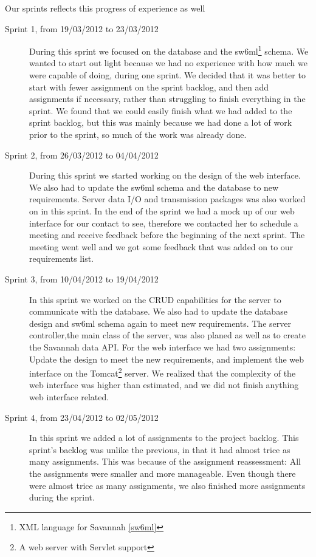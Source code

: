 Our sprints reflects this progress of experience as well

\begin{description}
\item [Sprint 1, from 19/03/2012 to 23/03/2012]
	During this sprint we focused on the database and the sw6ml\footnote{XML language for Savannah \autoref{sw6ml}} schema. We wanted to start out light because we had no experience with how much we were capable of doing, during one sprint. We decided that it was better to start with fewer assignment on the sprint backlog, and then add assignments if necessary, rather than struggling to finish everything in the sprint. We found that we could easily finish what we had added to the sprint backlog, but this was mainly because we had done a lot of work prior to the sprint, so much of the work was already done.
\item[Sprint 2, from 26/03/2012 to 04/04/2012]
	During this sprint we started working on the design of the web interface. We also had to update the sw6ml schema and the database to new requirements. Server data I/O and transmission packages was also worked on in this sprint. In the end of the sprint we had a mock up of our web interface for our contact to see, therefore we contacted her to schedule a meeting and receive feedback before the beginning of the next sprint. The meeting went well and we got some feedback that was added on to our requirements list. 
\item[Sprint 3, from 10/04/2012 to 19/04/2012]
	In this sprint we worked on the CRUD capabilities for the server to communicate with the database. We also had to update the database design and sw6ml schema again to meet new requirements. The server controller,the main class of the server, was also planed as well as to create the Savannah data API. For the web interface we had two assignments: Update the design to meet the new requirements, and implement the web interface on the Tomcat\footnote{A web server with Servlet support} server. We realized that the complexity of the web interface was higher than estimated, and we did not finish anything web interface related.
\item [Sprint 4, from 23/04/2012 to 02/05/2012]
	In this sprint we added a lot of assignments to the project backlog. This sprint's backlog was unlike the previous, in that it had almost trice as many assignments. This was because of the assignment reassessment: All the assignments were smaller and more manageable. Even though there were almost trice as many assignments, we also finished more assignments during the sprint.

\end{description}
